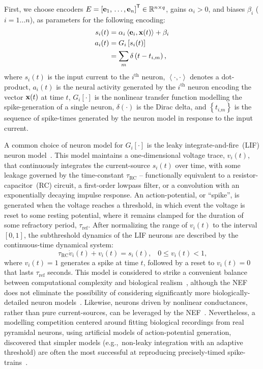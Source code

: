 First, we choose encoders $E = {\left[ \mathbf{e}_1\text{,}\, \ldots\text{,}\, \mathbf{e}_n \right]}^\mathsf{T} \in \mathbb{R}^{n \times q}$, gains $\alpha_i > 0$, and biases $\beta_i$ ($i = 1 \ldots n$), as parameters for the following encoding:
\begin{equation}
\begin{aligned} \label{eq:encoding}
s_i(t) &= \alpha_i \left\langle \mathbf{e}_i, \mathbf{x}(t) \right\rangle + \beta_i \\
a_i(t) &= G_i \left[ s_i(t) \right] \\
&= \sum_m \delta \left(t - t_{i\text{,}m} \right) \text{,}
\end{aligned}
\end{equation}
where $s_i(t)$ is the input current to the $i^\text{th}$ neuron, $\left\langle \cdot , \cdot \right\rangle$ denotes a dot-product,
$a_i(t)$ is the neural activity generated by the $i^{\text{th}}$ neuron encoding the vector $\mathbf{x}(t)$ at time $t$, $G_i \left[ \cdot \right]$ is the nonlinear transfer function modelling the spike-generation of a single neuron,
$\delta(\cdot)$ is the Dirac delta, and $\left\{ t_{i\text{,}m} \right\}$ is the sequence of spike-times generated by the neuron model in response to the input current.

A common choice of neuron model for $G_i\left[ \cdot \right]$ is the leaky integrate-and-fire~(LIF) neuron model~\citep{koch1998methods}.
This model maintains a one-dimensional voltage trace, $v_i(t)$, that continuously integrates the current-source $s_i(t)$ over time, with some leakage governed by the time-constant $\tau_\text{RC}$ -- functionally equivalent to a resistor-capacitor~(RC) circuit, a first-order lowpass filter, or a convolution with an exponentially decaying impulse response.
An action-potential, or ``spike'', is generated when the voltage reaches a threshold, in which event the voltage is reset to some resting potential, where it remains clamped for the duration of some refractory period, $\tau_\text{ref}$.
After normalizing the range of $v_i(t)$ to the interval $[0, 1]$, the subthreshold dynamics of the LIF neurons are described by the continuous-time dynamical system:
\begin{equation} \label{eq:lif-model}
\tau_\text{RC} \dot{v}_i(t) + v_i(t) = s_i(t) \text{,} \quad 0 \le v_i(t) < 1 \text{,}
\end{equation}
where $v_i(t) = 1$ generates a spike at time $t$, followed by a reset to $v_i(t) = 0$ that lasts $\tau_\text{ref}$ seconds.
This model is considered to strike a convenient balance between computational complexity and biological realism~\citep{eliasmith2003a}, although the NEF does not eliminate the possibility of considering significantly more biologically-detailed neuron models~\citep{duggins2017incorporating}.
Likewise, neurons driven by nonlinear conductances, rather than pure current-sources, can be leveraged by the NEF~\citep{stoeckel2018}.
Nevertheless, a modelling competition centered around fitting biological recordings from real pyramidal neurons, using artificial models of action-potential generation, discovered that simpler models (e.g.,~non-leaky integration with an adaptive threshold) are often the most successful at reproducing precisely-timed spike-trains~\citep{gerstner2009good}.


